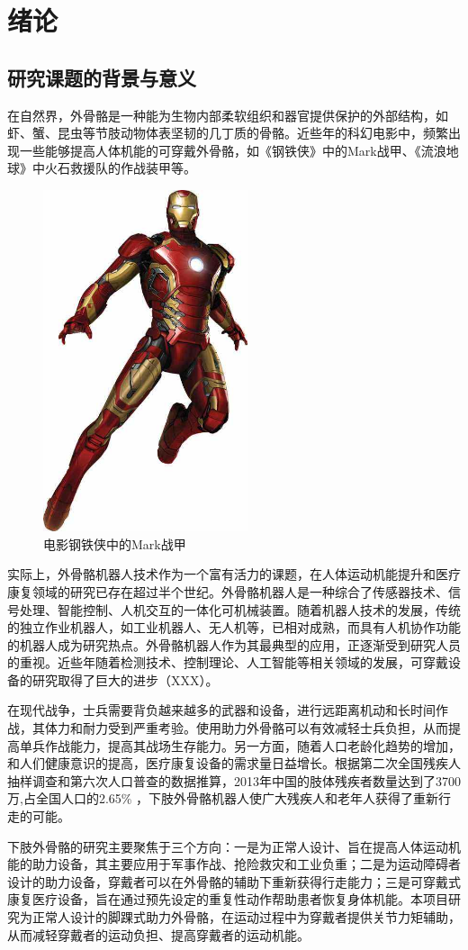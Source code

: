 \chapter{绪论}
\section{研究课题的背景与意义}
在自然界，外骨骼是一种能为生物内部柔软组织和器官提供保护的外部结构，如虾、蟹、昆虫等节肢动物体表坚韧的几丁质的骨骼。近些年的科幻电影中，频繁出现一些能够提高人体机能的可穿戴外骨骼，如《钢铁侠》中的Mark战甲、《流浪地球》中火石救援队的作战装甲等。

\begin{figure}[htb]
    \includegraphics[width=6cm]{fig/p2_mark.jpg}
    \caption{电影钢铁侠中的Mark战甲}
    \label{fig:mark}
\end{figure}

实际上，外骨骼机器人技术作为一个富有活力的课题，在人体运动机能提升\cite{p1}和医疗康复\cite{p2}领域的研究已存在超过半个世纪。外骨骼机器人是一种综合了传感器技术、信号处理、智能控制、人机交互的一体化可机械装置。随着机器人技术的发展，传统的独立作业机器人，如工业机器人、无人机等，已相对成熟，而具有人机协作功能的机器人成为研究热点。外骨骼机器人作为其最典型的应用，正逐渐受到研究人员的重视。近些年随着检测技术、控制理论、人工智能等相关领域的发展，可穿戴设备的研究取得了巨大的进步（XXX）。

在现代战争，士兵需要背负越来越多的武器和设备，进行远距离机动和长时间作战，其体力和耐力受到严重考验。使用助力外骨骼可以有效减轻士兵负担，从而提高单兵作战能力，提高其战场生存能力。另一方面，随着人口老龄化趋势的增加，和人们健康意识的提高，医疗康复设备的需求量日益增长。根据第二次全国残疾人抽样调查和第六次人口普查的数据推算，2013年中国的肢体残疾者数量达到了3700万,占全国人口的2.65\% \cite{p3}，下肢外骨骼机器人使广大残疾人和老年人获得了重新行走的可能。

下肢外骨骼的研究主要聚焦于三个方向：一是为正常人设计、旨在提高人体运动机能的助力设备，其主要应用于军事作战、抢险救灾和工业负重；二是为运动障碍者设计的助力设备，穿戴者可以在外骨骼的辅助下重新获得行走能力；三是可穿戴式康复医疗设备，旨在通过预先设定的重复性动作帮助患者恢复身体机能。本项目研究为正常人设计的脚踝式助力外骨骼，在运动过程中为穿戴者提供关节力矩辅助，从而减轻穿戴者的运动负担、提高穿戴者的运动机能。
